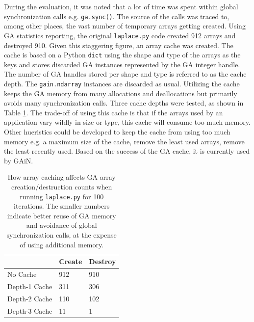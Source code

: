 \documentclass[preprint]{sigplanconf}
\begin{document}
During the evaluation, it was noted that a lot of time was spent within global
synchronization calls e.g. \verb=ga.sync()=. The source of the calls was
traced to, among other places, the vast number of temporary arrays getting
created.  Using GA statistics reporting, the original \verb=laplace.py= code
created 912 arrays and destroyed 910. Given this staggering figure, an array
cache was created. The cache is based on a Python \verb=dict= using the shape
and type of the arrays as the keys and stores discarded GA instances
represented by the GA integer handle. The number of GA handles stored per
shape and type is referred to as the cache depth. The \verb=gain.ndarray=
instances are discarded as usual.  Utilizing the cache keeps the GA memory
from many allocations and deallocations but primarily avoids many
synchronization calls. Three cache depths were tested, as shown in Table
\ref{tab:cache}. The trade-off of using this cache is that if the arrays used
by an application vary wildly in size or type, this cache will consume too
much memory. Other hueristics could be developed to keep the cache from using
too much memory e.g. a maximum size of the cache, remove the least used
arrays, remove the least recently used.  Based on the success of the GA cache,
it is currently used by GAiN.


\begin{table}
\begin{center}
\begin{tabular}{l|l|l}
              & Create & Destroy \\
\hline
No Cache      & 912    & 910     \\
Depth-1 Cache & 311    & 306     \\
Depth-2 Cache & 110    & 102     \\
Depth-3 Cache &  11    &   1     \\
\end{tabular}
\caption{
How array caching affects GA array creation/destruction counts when running
\texttt{laplace.py} for 100 iterations. The smaller numbers indicate better
reuse of GA memory and avoidance of global synchronization calls, at the
expense of using additional memory.
}
\label{tab:cache}
\end{center}
\end{table}
\end{document}
